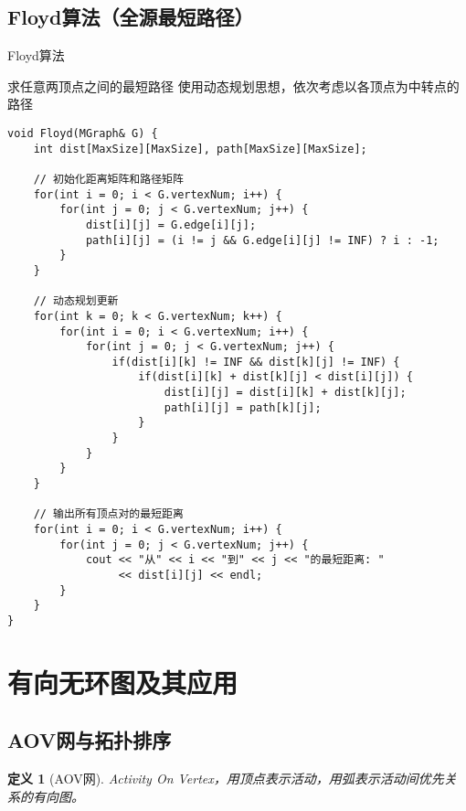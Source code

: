 \documentclass[12pt,a4paper]{amsart}
\newtheorem{definition}{定义}[section]
\begin{document}
\subsection{Floyd算法（全源最短路径）}

\begin{algorithm}[H]
\caption{Floyd算法}
\begin{algorithmic}[1]
\STATE 求任意两顶点之间的最短路径
\STATE 使用动态规划思想，依次考虑以各顶点为中转点的路径
\end{algorithmic}
\end{algorithm}

\begin{lstlisting}[caption=Floyd算法实现]
void Floyd(MGraph& G) {
    int dist[MaxSize][MaxSize], path[MaxSize][MaxSize];
    
    // 初始化距离矩阵和路径矩阵
    for(int i = 0; i < G.vertexNum; i++) {
        for(int j = 0; j < G.vertexNum; j++) {
            dist[i][j] = G.edge[i][j];
            path[i][j] = (i != j && G.edge[i][j] != INF) ? i : -1;
        }
    }
    
    // 动态规划更新
    for(int k = 0; k < G.vertexNum; k++) {
        for(int i = 0; i < G.vertexNum; i++) {
            for(int j = 0; j < G.vertexNum; j++) {
                if(dist[i][k] != INF && dist[k][j] != INF) {
                    if(dist[i][k] + dist[k][j] < dist[i][j]) {
                        dist[i][j] = dist[i][k] + dist[k][j];
                        path[i][j] = path[k][j];
                    }
                }
            }
        }
    }
    
    // 输出所有顶点对的最短距离
    for(int i = 0; i < G.vertexNum; i++) {
        for(int j = 0; j < G.vertexNum; j++) {
            cout << "从" << i << "到" << j << "的最短距离: " 
                 << dist[i][j] << endl;
        }
    }
}
\end{lstlisting}

\section{有向无环图及其应用}

\subsection{AOV网与拓扑排序}

\begin{definition}[AOV网]
Activity On Vertex，用顶点表示活动，用弧表示活动间优先关系的有向图。
\end{definition}
\end{document}
